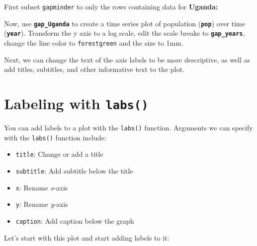 \documentclass[
  letterpaper,
  DIV=11,
  numbers=noendperiod]{scrreprt}
\providecommand{\tightlist}{%
  \setlength{\itemsep}{0pt}\setlength{\parskip}{0pt}}\usepackage{longtable,booktabs,array}
\begin{document}
\begin{tcolorbox}[enhanced jigsaw, colframe=quarto-callout-tip-color-frame, rightrule=.15mm, opacityback=0, breakable, coltitle=black, colbacktitle=quarto-callout-tip-color!10!white, bottomrule=.15mm, leftrule=.75mm, toprule=.15mm, arc=.35mm, bottomtitle=1mm, colback=white, left=2mm, opacitybacktitle=0.6, titlerule=0mm, title=\textcolor{quarto-callout-tip-color}{\faLightbulb}\hspace{0.5em}{Practice}, toptitle=1mm]

First subset \texttt{gapminder} to only the rows containing data for
\textbf{Uganda:}

Now, use \textbf{\texttt{gap\_Uganda}} to create a time series plot of
population (\textbf{\texttt{pop}}) over time (\textbf{\texttt{year}}).
Transform the y axis to a log scale, edit the scale breaks to
\textbf{\texttt{gap\_years}}, change the line color to
\texttt{forestgreen} and the size to 1mm.

\end{tcolorbox}

Next, we can change the text of the axis labels to be more descriptive,
as well as add titles, subtitles, and other informative text to the
plot.

\hypertarget{labeling-with-labs}{%
\section{\texorpdfstring{Labeling with
\texttt{labs()}}{Labeling with labs()}}\label{labeling-with-labs}}

You can add labels to a plot with the \texttt{labs()} function.
Arguments we can specify with the \texttt{labs()} function include:

\begin{itemize}
\tightlist
\item
  \texttt{title}: Change or add a title
\item
  \texttt{subtitle}: Add subtitle below the title
\item
  \texttt{x}: Rename \emph{x}-axis
\item
  \texttt{y}: Rename \emph{y}-axis
\item
  \texttt{caption}: Add caption below the graph
\end{itemize}

Let's start with this plot and start adding labels to it:
\end{document}
